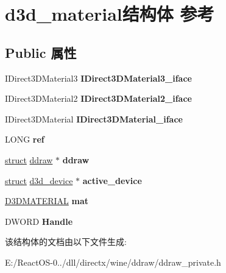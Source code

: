 \hypertarget{structd3d__material}{}\section{d3d\+\_\+material结构体 参考}
\label{structd3d__material}
\subsection*{Public 属性}
\begin{DoxyCompactItemize}
\item 
\mbox{\label{structd3d__material_afaf6398e5f8b777971b98844f5e2440e}} 
I\+Direct3\+D\+Material3 {\bfseries I\+Direct3\+D\+Material3\+\_\+iface}
\item 
\mbox{\label{structd3d__material_af4d49a38faf3319e898b9cb57e6bf316}} 
I\+Direct3\+D\+Material2 {\bfseries I\+Direct3\+D\+Material2\+\_\+iface}
\item 
\mbox{\label{structd3d__material_ad338af7c8351b527ecb63ba55288cf60}} 
I\+Direct3\+D\+Material {\bfseries I\+Direct3\+D\+Material\+\_\+iface}
\item 
\mbox{\label{structd3d__material_a1a99db4cee90b0fbf504123f6df222db}} 
L\+O\+NG {\bfseries ref}
\item 
\mbox{\label{structd3d__material_af2a1a309b14d40a08504460b19b65916}} 
\hyperlink{interfacestruct}{struct} \hyperlink{structddraw}{ddraw} $\ast$ {\bfseries ddraw}
\item 
\mbox{\label{structd3d__material_a9813ab661da64d68c1ab7e13cbc31788}} 
\hyperlink{interfacestruct}{struct} \hyperlink{structd3d__device}{d3d\+\_\+device} $\ast$ {\bfseries active\+\_\+device}
\item 
\mbox{\label{structd3d__material_a71d8a4334fe2f21250e650f8c309f6ad}} 
\hyperlink{struct___d3_d_m_a_t_e_r_i_a_l}{D3\+D\+M\+A\+T\+E\+R\+I\+AL} {\bfseries mat}
\item 
\mbox{\label{structd3d__material_ad7e996228ec90c8a08f61cb297e1851d}} 
D\+W\+O\+RD {\bfseries Handle}
\end{DoxyCompactItemize}


该结构体的文档由以下文件生成\+:\begin{DoxyCompactItemize}
\item 
E\+:/\+React\+O\+S-\/0../dll/directx/wine/ddraw/ddraw\+\_\+private.\+h\end{DoxyCompactItemize}
